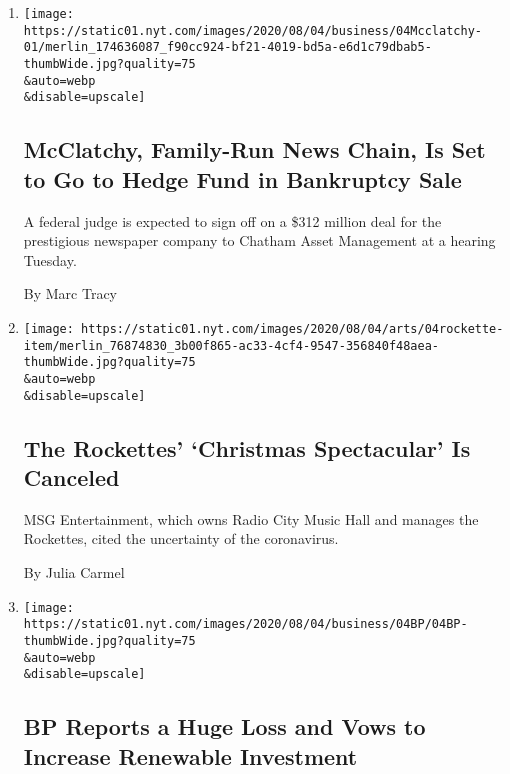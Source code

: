 \begin{enumerate}
\def\labelenumi{\arabic{enumi}.}
\item
  \href{/2020/08/04/business/media/mcclatchy-newspapers-bankrutpcy-chatham.html}{}

  \texttt{[image: https://static01.nyt.com/images/2020/08/04/business/04Mcclatchy-01/merlin\_174636087\_f90cc924-bf21-4019-bd5a-e6d1c79dbab5-thumbWide.jpg?quality=75\\\&auto=webp\\\&disable=upscale]}

  \hypertarget{mcclatchy-family-run-news-chain-is-set-to-go-to-hedge-fund-in-bankruptcy-sale}{%
  \subsection{McClatchy, Family-Run News Chain, Is Set to Go to Hedge
  Fund in Bankruptcy
  Sale}\label{mcclatchy-family-run-news-chain-is-set-to-go-to-hedge-fund-in-bankruptcy-sale}}

  A federal judge is expected to sign off on a \$312 million deal for
  the prestigious newspaper company to Chatham Asset Management at a
  hearing Tuesday.

  By Marc Tracy
\item
  \href{/2020/08/04/theater/radio-city-rockettes-christmas-canceled.html}{}

  \texttt{[image: https://static01.nyt.com/images/2020/08/04/arts/04rockette-item/merlin\_76874830\_3b00f865-ac33-4cf4-9547-356840f48aea-thumbWide.jpg?quality=75\\\&auto=webp\\\&disable=upscale]}

  \hypertarget{the-rockettes-christmas-spectacular-is-canceled}{%
  \subsection{The Rockettes' `Christmas Spectacular' Is
  Canceled}\label{the-rockettes-christmas-spectacular-is-canceled}}

  MSG Entertainment, which owns Radio City Music Hall and manages the
  Rockettes, cited the uncertainty of the coronavirus.

  By Julia Carmel
\item
  \href{/2020/08/04/business/energy-environment/bp-renewable-investment.html}{}

  \texttt{[image: https://static01.nyt.com/images/2020/08/04/business/04BP/04BP-thumbWide.jpg?quality=75\\\&auto=webp\\\&disable=upscale]}

  \hypertarget{bp-reports-a-huge-loss-and-vows-to-increase-renewable-investment}{%
  \subsection{BP Reports a Huge Loss and Vows to Increase Renewable
  Investment}\label{bp-reports-a-huge-loss-and-vows-to-increase-renewable-investment}}


\end{enumerate}
